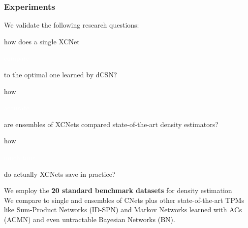 \documentclass[xcolor={usenames,dvipsnames,svgnames}, compress]{beamer}
\newcommand{\highlighttext}[2][yellow]{{\colorbox{#1}{\strut\textcolor{white}{#2}}}}
\begin{document}
  \begin{frame}[t]
    \small
    \frametitle{Experiments}
    We validate the following research questions:
    \begin{center}
      \begin{minipage}{0.9\linewidth}
        \begin{description}[align=parright]
          \setlength{\itemsep}{-2pt}
        \item[\textbf{(Q1)}]
          how does a single XCNet \highlighttext[lacamlilac]{compare} to the optimal one learned by
\textsf{dCSN}?
        \item[\textbf{(Q2)}]
          how \highlighttext[lacamlilac]{accurate} are ensembles of XCNets compared
state-of-the-art density estimators? 
        \item[\textbf{(Q3)}]
          how \highlighttext[gold4]{much time} do actually XCNets save in practice?
        \end{description}
      \end{minipage}
    \end{center}\vspace{10pt}

    We employ the \textbf{20 standard benchmark datasets} for density
    estimation~\emph{\parencite{Haaren2012,Vergari2015}}\\[10pt]

    We compare to single and ensembles of CNets plus other
    state-of-the-art  TPMs like
    Sum-Product Networks (\textsf{ID-SPN}) and Markov Networks learned
    with ACs (\textsf{ACMN}) and even untractable Bayesian Networks (\textsf{BN}).
    
  \end{frame}
\end{document}
